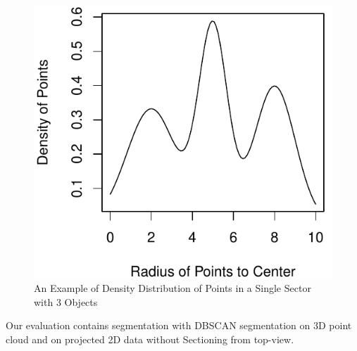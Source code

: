 \begin{figure}[!h]
\begin{center}
  \includegraphics[scale=0.6]{./images/sectors_density.pdf}
  \caption{An Example of Density Distribution of Points in a Single Sector with 3 Objects}
  \label{fig:SectorDensity}
\end{center}
\end{figure}
Our evaluation contains segmentation with DBSCAN segmentation on 3D point cloud and on projected 2D data without Sectioning from top-view.



